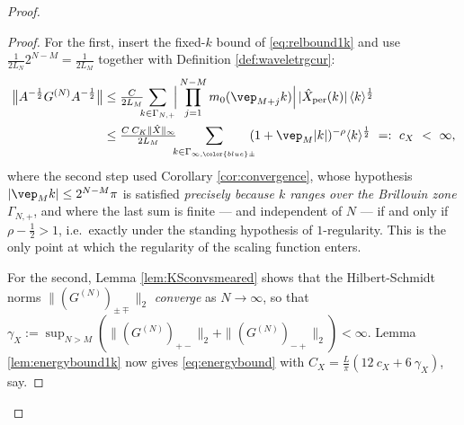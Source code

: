\documentclass[a4paper, 11pt]{article}
\DeclareMathOperator{\1}{\mathds{1}}
\DeclareMathOperator{\per}{per}
\begin{document}
\begin{proof}
\begin{proof}
For the first, insert the fixed-$k$ bound of \eqref{eq:relbound1k} and use $\tfrac{1}{2L_{N}}2^{N-M}=\tfrac{1}{2L_{M}}$ together with Definition \ref{def:waveletrgcur}:
\begin{align}
\label{eq:relbound1psmeared}
\big\|A^{-\frac{1}{2}}G^{(N)}A^{-\frac{1}{2}}\big\| & \leq \tfrac{C}{2L_{M}}\!\!\!\sum_{k\in\Gamma_{N,+}}\!\!\Big|\prod_{j=1}^{N-M}m_{0}(\vep_{M+j}k)\Big|\!\ |\hat{X}_{\per}(k)|\!\ \langle k\rangle^{\frac{1}{2}} \\ \nonumber
& \leq \tfrac{C\!\ C_{K}\|\hat{X}\|_{\infty}}{2L_{M}}\!\!\!\sum_{k\in\Gamma_{\infty,{\color{blue}\pm}}}\!\!\!(1+\vep_{M}|k|)^{-\rho}\langle k\rangle^{\frac{1}{2}} \ =:\ c_{X} \ <\ \infty,
\end{align}
where the second step used Corollary \ref{cor:convergence}, whose hypothesis $|\vep_{M}k|\leq2^{N-M}\pi$ is satisfied \emph{precisely because $k$ ranges over the Brillouin zone} $\Gamma_{N,+}$, and where the last sum is finite --- and independent of $N$ --- if and only if $\rho-\tfrac{1}{2}>1$, i.e.~exactly under the standing hypothesis of $1$-regularity. This is the only point at which the regularity of the scaling function enters.

For the second, Lemma \ref{lem:KSconvsmeared} shows that the Hilbert-Schmidt norms $\|(G^{(N)})_{\pm\mp}\|_{2}$ \emph{converge} as $N\rightarrow\infty$, so that $\gamma_{X}:=\sup_{N>M}(\|(G^{(N)})_{+-}\|_{2}+\|(G^{(N)})_{-+}\|_{2})<\infty$. Lemma \ref{lem:energybound1k} now gives \eqref{eq:energybound} with $C_{X}=\tfrac{L}{\pi}(12\!\ c_{X}+6\!\ \gamma_{X})$, say.
\end{proof}


\end{proof}
\end{document}
